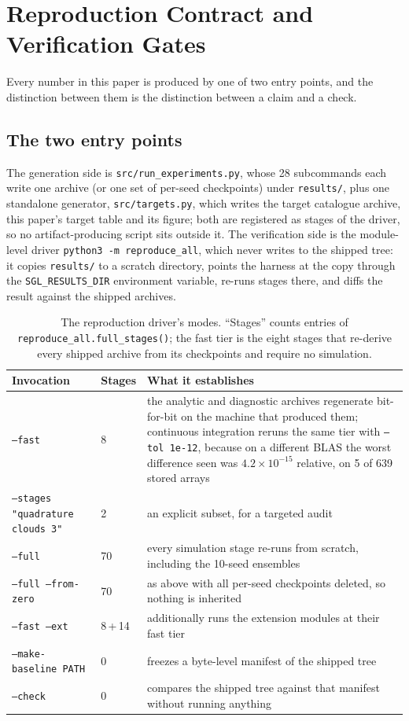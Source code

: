 \documentclass[twocolumn,10pt]{article}
\begin{document}
\section{Reproduction Contract and Verification Gates}
\label{app:repro}

Every number in this paper is produced by one of two entry points, and the
distinction between them is the distinction between a claim and a check.

\subsection{The two entry points}
The generation side is {\tt src/run\_experiments.py}, whose 28 subcommands each
write one archive (or one set of per-seed checkpoints) under {\tt results/}, plus
one standalone generator, {\tt src/targets.py}, which writes the target catalogue
archive, this paper's target table and its figure; both are registered as stages of
the driver, so no artifact-producing script sits outside it.
The verification side is the module-level driver
\mbox{{\tt python3 -m reproduce\_all}}, which never writes to the shipped tree:
it copies {\tt results/} to a scratch directory, points the harness at the copy
through the {\tt SGL\_RESULTS\_DIR} environment variable, re-runs stages there,
and diffs the result against the shipped archives.

\begin{table}[t]
\centering
\caption{The reproduction driver's modes. ``Stages'' counts entries of
{\tt reproduce\_all.full\_stages()}; the fast tier is the eight stages that
re-derive every shipped archive from its checkpoints and require no simulation.}
\label{tab:repro}
\footnotesize
\setlength{\tabcolsep}{4pt}
\begin{tabular}{llp{}}
\toprule
Invocation & Stages & What it establishes \\
\midrule
{\tt --fast} & 8 & the analytic and diagnostic archives regenerate bit-for-bit
on the machine that produced them; continuous integration reruns the same tier
with {\tt --tol 1e-12}, because on a different BLAS the worst difference seen was
$4.2\times10^{-15}$ relative, on 5 of 639 stored arrays \\
{\tt --stages "quadrature clouds 3"} & 2 & an explicit subset, for a targeted
audit \\
{\tt --full} & 70 & every simulation stage re-runs from scratch, including the
10-seed ensembles \\
{\tt --full --from-zero} & 70 & as above with all per-seed checkpoints deleted,
so nothing is inherited \\
{\tt --fast --ext} & 8\,+\,14 & additionally runs the extension modules
at their fast tier \\
{\tt --make-baseline PATH} & 0 & freezes a byte-level manifest of the shipped
tree \\
{\tt --check} & 0 & compares the shipped tree against that manifest without
running anything \\
\bottomrule
\end{tabular}
\end{table}
\end{document}
